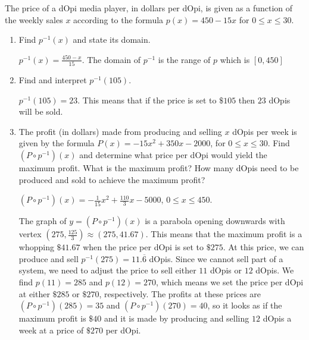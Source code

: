 \documentclass{ximera}
\begin{document}
\begin{problem}
The price of a dOpi media player, in dollars per dOpi, is given as a function of the weekly sales $x$ according to the formula $p(x) = 450-15x$ for $0 \leq x \leq 30$.

\begin{enumerate}
\item 
Find $p^{-1}(x)$ and state its domain.

\begin{solution}
$p^{-1}(x) = \frac{450-x}{15}$.  The domain of $p^{-1}$ is the range of $p$ which is $[0,450]$
\end{solution}

\item 
Find and interpret $p^{-1}(105)$.

\begin{solution}
$p^{-1}(105) = 23$. This means that if the price is set to $\$105$ then $23$ dOpis will be sold.
\end{solution}

\item 
The profit (in dollars) made from producing and selling $x$ dOpis per week is given by the formula $P(x)= -15x^2+350x-2000$, for $0 \leq x \leq 30$.  Find $\left(P \circ p^{-1}\right)(x)$ and determine what price per dOpi would yield the maximum profit.  What is the maximum profit?  How many dOpis need to be produced and sold to achieve the maximum profit?

\begin{solution}
$\left(P\circ p^{-1}\right)(x) = -\frac{1}{15} x^2 + \frac{110}{3} x - 5000$, $0 \leq x \leq 450$.  


The graph of $y = \left(P\circ p^{-1}\right)(x)$ is a parabola opening downwards with vertex $\left(275, \frac{125}{3}\right) \approx (275, 41.67)$.  This means that the maximum profit is a whopping $\$41.67$ when the price per dOpi is set to $\$275$.   At this price, we can produce and sell $p^{-1}(275) = 11.\overline{6}$ dOpis.  Since we cannot sell part of a system, we need to adjust the price to sell either $11$ dOpis or $12$ dOpis. We find $p(11) = 285$ and $p(12) = 270$, which means we set the price per dOpi at either $\$285$ or $\$270$, respectively.  The profits at these prices are $\left(P\circ p^{-1}\right)(285) = 35$ and  $\left(P\circ p^{-1}\right)(270) = 40$, so it looks as if the maximum profit is $\$40$ and it is made by producing and selling $12$ dOpis a week at a price of $\$270$ per dOpi.
\end{solution}

\end{enumerate}
\end{problem}
\end{document}
